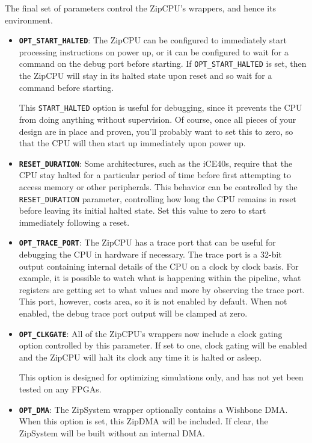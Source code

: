 \documentclass{gqtekspec}
\begin{document}
The final set of parameters control the ZipCPU's wrappers, and hence its
environment.
\begin{itemize} \item {\bf\tt OPT\_START\_HALTED}: The ZipCPU can be configured
	to immediately start processing instructions on power up, or it can be
	configured to wait for a command on the debug port before starting.
	If {\tt OPT\_START\_HALTED} is set, then the ZipCPU will stay in its
	halted state upon reset and so wait for a command before starting.

	This {\tt START\_HALTED} option is useful for debugging, since it
	prevents the CPU from doing anything without supervision.  Of course,
	once all pieces of your design are in place and proven, you'll probably
	want to set this to zero, so that the CPU will then start up
	immediately upon power up.

\item {\bf\tt RESET\_DURATION}: Some architectures, such as the iCE40s,
	require that the CPU stay halted for a particular period of time
	before first attempting to access memory or other peripherals.  This
	behavior can be controlled by the {\tt RESET\_DURATION} parameter,
	controlling how long the CPU remains in reset before leaving its
	initial halted state.  Set this value to zero to start immediately
	following a reset.

\item {\bf\tt OPT\_TRACE\_PORT}: The ZipCPU has a trace port that can be useful
	for debugging the CPU in hardware if necessary.  The trace port is
	a 32-bit output containing internal details of the CPU on a clock by
	clock basis.  For example, it is possible to watch what is happening
	within the pipeline, what registers are getting set to what values and
	more by observing the trace port.  This port, however, costs area,
	so it is not enabled by default.  When not enabled, the debug trace
	port output will be clamped at zero.

\item {\bf\tt OPT\_CLKGATE}: All of the ZipCPU's wrappers now include a clock
	gating option controlled by this parameter.  If set to one, clock
	gating will be enabled and the ZipCPU will halt its clock any
	time it is halted or asleep.

	This option is designed for optimizing simulations only, and has not
	yet been tested on any FPGAs.

\item {\bf\tt OPT\_DMA}: The ZipSystem wrapper optionally contains a Wishbone
	DMA.  When this option is set, this ZipDMA will be included.  If clear,
	the ZipSystem will be built without an internal DMA.


\end{itemize}
\end{document}
